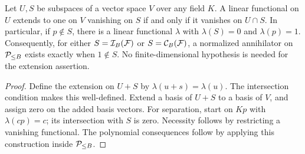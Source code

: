 \begin{lemma}\label{lem:duality}
Let \(U,S\) be subspaces of a vector space \(V\) over any field \(K\).
A linear functional on \(U\) extends to one on \(V\) vanishing on \(S\)
if and only if it vanishes on \(U\cap S\).
In particular, if \(p\notin S\), there is a linear functional
\(\lambda\) with \(\lambda(S)=0\) and \(\lambda(p)=1\).
Consequently, for either \(S=\mathcal I_B(\mathcal F)\) or
\(S=\mathcal C_B(\mathcal F)\), a normalized annihilator on
\(\mathcal P_{\le B}\) exists exactly when \(1\notin S\).
No finite-dimensional hypothesis is needed for the extension assertion.
\end{lemma}
\begin{proof}
Define the extension on \(U+S\) by \(\lambda(u+s)=\lambda(u)\).
The intersection condition makes this well-defined. Extend a basis of
\(U+S\) to a basis of \(V\), and assign zero on the added basis vectors.
For separation, start on \(Kp\) with \(\lambda(cp)=c\); its intersection
with \(S\) is zero. Necessity follows by restricting a vanishing functional.
The polynomial consequences follow by applying this construction inside
\(\mathcal P_{\le B}\).
\end{proof}
